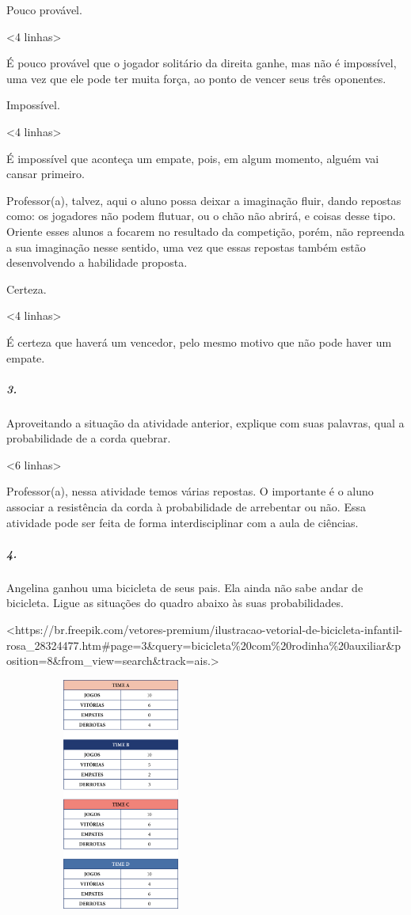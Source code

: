 Pouco provável.

\textless{}4 linhas\textgreater{}

É pouco provável que o jogador solitário da direita ganhe, mas não é
impossível, uma vez que ele pode ter muita força, ao ponto de vencer
seus três oponentes.

Impossível.

\textless{}4 linhas\textgreater{}

É impossível que aconteça um empate, pois, em algum momento, alguém vai
cansar primeiro.

Professor(a), talvez, aqui o aluno possa deixar a imaginação fluir,
dando repostas como: os jogadores não podem flutuar, ou o chão não
abrirá, e coisas desse tipo. Oriente esses alunos a focarem no resultado
da competição, porém, não repreenda a sua imaginação nesse sentido, uma
vez que essas repostas também estão desenvolvendo a habilidade proposta.

Certeza.

\textless{}4 linhas\textgreater{}

É certeza que haverá um vencedor, pelo mesmo motivo que não pode haver
um empate.

\subparagraph{3.}\label{section-70}

Aproveitando a situação da atividade anterior, explique com suas
palavras, qual a probabilidade de a corda quebrar.

\textless{}6 linhas\textgreater{}

Professor(a), nessa atividade temos várias repostas. O importante é o
aluno associar a resistência da corda à probabilidade de arrebentar ou
não. Essa atividade pode ser feita de forma interdisciplinar com a aula
de ciências.

\subparagraph{4.}\label{section-71}

Angelina ganhou uma bicicleta de seus pais. Ela ainda não sabe andar de
bicicleta. Ligue as situações do quadro abaixo às suas probabilidades.

\textless{}https://br.freepik.com/vetores-premium/ilustracao-vetorial-de-bicicleta-infantil-rosa\_28324477.htm\#page=3\&query=bicicleta\%20com\%20rodinha\%20auxiliar\&position=8\&from\_view=search\&track=ais.\textgreater{}

\includegraphics[width=3.01042in,height=3.01042in]{media/image85.png}

